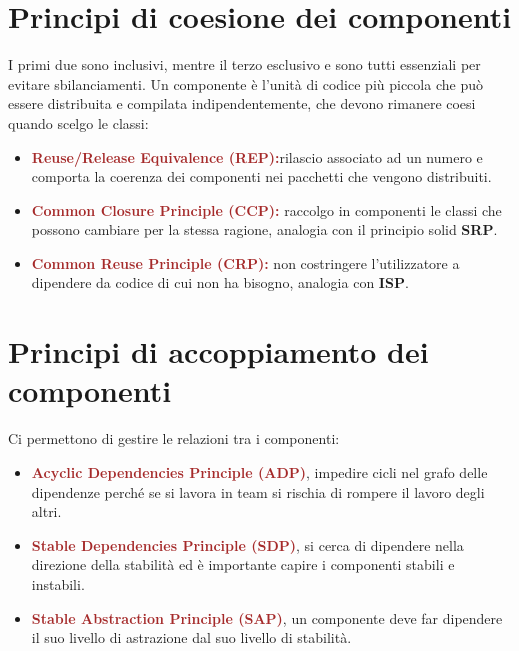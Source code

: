 \section{Principi di coesione dei componenti}
I primi due sono inclusivi, mentre il terzo esclusivo e sono tutti essenziali per evitare sbilanciamenti. Un componente è l'unità di codice più piccola che può essere distribuita e compilata indipendentemente, che devono rimanere coesi quando scelgo le classi:
\begin{itemize}
    \item \textbf{\textcolor{brown}{Reuse/Release Equivalence (REP):}}rilascio associato ad un numero e comporta la coerenza dei componenti nei pacchetti che vengono distribuiti.
    \item \textbf{\textcolor{brown}{Common Closure Principle (CCP):}} raccolgo in componenti le classi che possono cambiare per la stessa ragione, analogia con il principio solid \textbf{SRP}.
    \item \textbf{\textcolor{brown}{Common Reuse Principle (CRP):}} non costringere l'utilizzatore a dipendere da codice di cui non ha bisogno, analogia con \textbf{ISP}.
\end{itemize}

\section{Principi di accoppiamento dei componenti}
Ci permettono di gestire le relazioni tra i componenti:
\begin{itemize}
    \item \textbf{\textcolor{brown}{Acyclic Dependencies Principle (ADP)}}, impedire cicli nel grafo delle dipendenze perché se si lavora in team si rischia di rompere il lavoro degli altri.
    \item \textbf{\textcolor{brown}{Stable Dependencies Principle (SDP)}}, si cerca di dipendere nella direzione della stabilità ed è importante capire i componenti stabili e instabili.
    \item \textbf{\textcolor{brown}{Stable Abstraction Principle (SAP)}}, un componente deve far dipendere il suo livello di astrazione dal suo livello di stabilità.
\end{itemize}